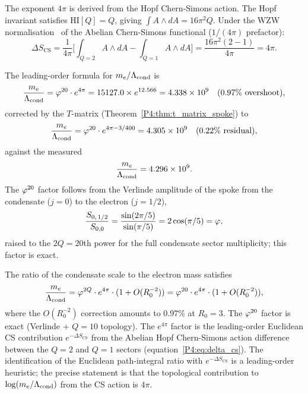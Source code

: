 The exponent $4\pi$ is derived from the Hopf Chern-Simons action.  The Hopf
invariant satisfies $\mathrm{HI}[Q] = Q$, giving $\int A\wedge dA = 16\pi^2 Q$.
Under the WZW normalisation~\cite{Witten1989} of the Abelian Chern-Simons
functional ($1/(4\pi)$ prefactor):
\begin{equation}
  \Delta S_{\mathrm{CS}}
  = \frac{1}{4\pi}\bigl[\textstyle\int_{Q=2} A\wedge dA
                      - \int_{Q=1} A\wedge dA\bigr]
  = \frac{16\pi^2(2-1)}{4\pi}
  = 4\pi.
  \label{P4:eq:delta_cs}
\end{equation}

The leading-order formula for $m_e/\Lambda_{\mathrm{cond}}$ is
\begin{equation}
  \frac{m_e}{\Lambda_{\mathrm{cond}}} = \varphi^{20}\cdot e^{4\pi}
  = 15127.0\times e^{12.566}
  = 4.338\times10^9 \quad(0.97\%\text{ overshoot}),
  \label{P4:eq:me_formula}
\end{equation}
corrected by the $T$-matrix (Theorem~\ref{P4:thm:t_matrix_spoke}) to
\begin{equation}
  \frac{m_e}{\Lambda_{\mathrm{cond}}} = \varphi^{20}\cdot e^{4\pi-3/400}
  = 4.305\times10^9 \quad(0.22\%\text{ residual}),
  \label{P4:eq:me_formula_corrected}
\end{equation}
against the measured
\begin{equation}
  \frac{m_e}{\Lambda_{\mathrm{cond}}} = 4.296\times10^9.
  \label{P4:eq:me_meas}
\end{equation}
The $\varphi^{20}$ factor follows from the Verlinde amplitude of the spoke
from the condensate ($j=0$) to the electron ($j=1/2$),
\begin{equation}
  \frac{S_{0,\,1/2}}{S_{0,0}} = \frac{\sin(2\pi/5)}{\sin(\pi/5)} = 2\cos(\pi/5) = \varphi,
  \label{P4:eq:verlinde_spoke}
\end{equation}
raised to the $2Q=20$th power for the full condensate sector multiplicity;
this factor is exact.

\begin{theorem}
\label{P4:thm:second_spoke}
The ratio of the condensate scale to the electron mass satisfies
\begin{equation}
  \frac{m_e}{\Lambda_{\mathrm{cond}}} = \varphi^{2Q}\cdot e^{4\pi}\cdot(1 + O(R_0^{-2}))
  = \varphi^{20}\cdot e^{4\pi}\cdot(1 + O(R_0^{-2})),
  \label{P4:eq:spoke_leading}
\end{equation}
where the $O(R_0^{-2})$ correction amounts to $0.97\%$ at $R_0=3$.
The $\varphi^{20}$ factor is exact (Verlinde + $Q=10$ topology).
The $e^{4\pi}$ factor is the leading-order Euclidean CS contribution
$e^{-\Delta S_\mathrm{CS}}$ from the Abelian Hopf Chern-Simons action difference
between the $Q=2$ and $Q=1$ sectors (equation~\eqref{P4:eq:delta_cs}).
The identification of the Euclidean path-integral ratio with $e^{-\Delta S_\mathrm{CS}}$
is a leading-order heuristic; the precise statement is that the
topological contribution to $\log(m_e/\Lambda_{\mathrm{cond}})$ from the CS action is $4\pi$.
\end{theorem}

